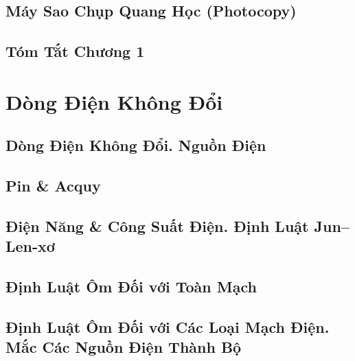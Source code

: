 \documentclass[oneside]{book}
\numberwithin{equation}{section}
\begin{document}
\section{Máy Sao Chụp Quang Học (Photocopy)}


\section{Tóm Tắt Chương 1}


\chapter{Dòng Điện Không Đổi}

\section{Dòng Điện Không Đổi. Nguồn Điện}


\section{Pin \& Acquy}


\section{Điện Năng \& Công Suất Điện. Định Luật Jun--Len-xơ}


\section{Định Luật Ôm Đối với Toàn Mạch}


\section{Định Luật Ôm Đối với Các Loại Mạch Điện. Mắc Các Nguồn Điện Thành Bộ}
\end{document}
